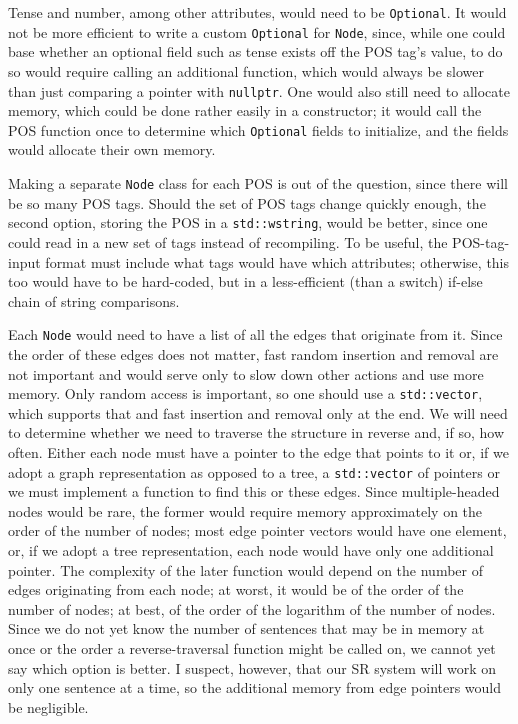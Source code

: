 \documentclass[12pt,letterpaper]{article}
\begin{document}
\begin{flushleft}
  Tense and number, among other attributes, would need to be \texttt{Optional}. It would not be more efficient to write a custom \texttt{Optional} for \texttt{Node}, since, while one could base whether an optional field such as tense exists off the POS tag's value, to do so would require calling an additional function, which would always be slower than just comparing a pointer with \texttt{nullptr}. One would also still need to allocate memory, which could be done rather easily in a constructor; it would call the POS function once to determine which \texttt{Optional} fields to initialize, and the fields would allocate their own memory.

  Making a separate \texttt{Node} class for each POS is out of the question, since there will be so many POS tags. Should the set of POS tags change quickly enough, the second option, storing the POS in a \texttt{std::wstring}, would be better, since one could read in a new set of tags instead of recompiling. To be useful, the POS-tag-input format must include what tags would have which attributes; otherwise, this too would have to be hard-coded, but in a less-efficient (than a switch) if-else chain of string comparisons.

  Each \texttt{Node} would need to have a list of all the edges that originate from it. Since the order of these edges does not matter, fast random insertion and removal are not important and would serve only to slow down other actions and use more memory. Only random access is important, so one should use a \texttt{std::vector}, which supports that and fast insertion and removal only at the end. We will need to determine whether we need to traverse the structure in reverse and, if so, how often. Either each node must have a pointer to the edge that points to it or, if we adopt a graph representation as opposed to a tree, a \texttt{std::vector} of pointers or we must implement a function to find this or these edges. Since multiple-headed nodes would be rare, the former would require memory approximately on the order of the number of nodes; most edge pointer vectors would have one element, or, if we adopt a tree representation, each node would have only one additional pointer. The complexity of the later function would depend on the number of edges originating from each node; at worst, it would be of the order of the number of nodes; at best, of the order of the logarithm of the number of nodes. Since we do not yet know the number of sentences that may be in memory at once or the order a reverse-traversal function might be called on, we cannot yet say which option is better. I suspect, however, that our SR system will work on only one sentence at a time, so the additional memory from edge pointers would be negligible.


\end{flushleft}
\end{document}
